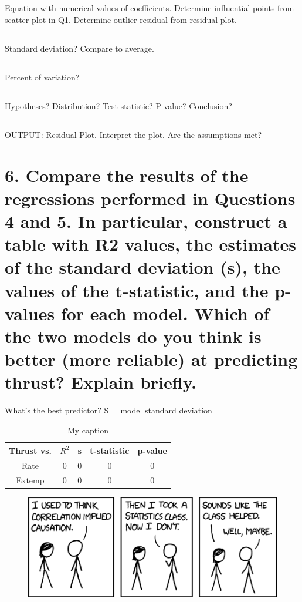 \documentclass[letterpaper]{article}
\begin{document}
\subsection{}
Equation with numerical values of coefficients. Determine
influential points from scatter plot in Q1. Determine outlier residual from residual plot.

\subsection{}
Standard deviation? Compare to average.

\subsection{}
Percent of variation?

\subsection{}
Hypotheses? Distribution? Test statistic? P-value? Conclusion?

\setcounter{subsection}{6}
\subsection{}
OUTPUT: Residual Plot. Interpret the plot. Are the assumptions met?

\section{6.	Compare the results of the regressions performed in Questions 4 and 5. In particular, construct a table with R2 values, the estimates of the standard deviation (s), the values of the t-statistic, and the p-values for each model. Which of the two models do you think is better (more reliable) at predicting thrust? Explain briefly.}
What’s the best predictor? S = model standard deviation

\begin{table}[H]
 \centering
 \begin{tabular}{|c|c|c|c|c|}
  \hline
  Thrust vs. & $R^2$ & s & t-statistic & p-value \\ \hline
  Rate       & 0     & 0 & 0           & 0       \\ \hline
  Extemp     & 0     & 0 & 0           & 0       \\ \hline
 \end{tabular}
 \caption{My caption}
 \label{q6}
\end{table}


\newpage
\thispagestyle{empty}
\begin{figure}
 \centering
 \includegraphics[width=\textwidth]{correlation.png}
 \label{xkcd}
\end{figure}
\end{document}
